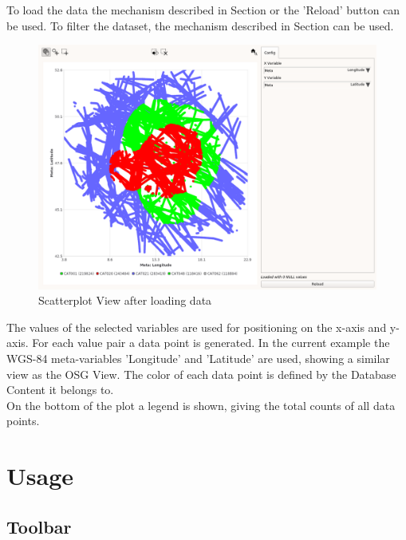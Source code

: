 To load the data the mechanism described in Section  or the 'Reload' button can be used. To filter the dataset, the mechanism described in Section  can be used. \\

\begin{figure}[H]
    \hspace*{-2cm}
    \includegraphics[width=18cm,frame]{figures/scatter_loaded.png}
  \caption{Scatterplot View after loading data}
\end{figure}

The values of the selected variables are used for positioning on the x-axis and y-axis. For each value pair a data point is generated. In the current example the WGS-84 meta-variables 'Longitude' and 'Latitude' are used, showing a similar view as the OSG View.
The color of each data point is defined by the Database Content it belongs to.\\


On the bottom of the plot a legend is shown, giving the total counts of all data points.

\section{Usage}

\subsection{Toolbar}

